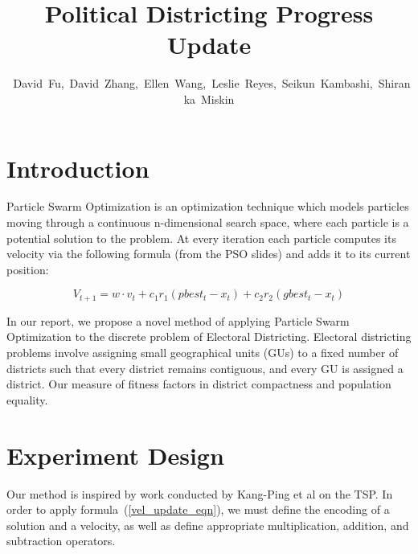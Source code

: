 \documentclass[journal]{IEEEtran}
\begin{document}
\title{Political Districting Progress Update}
\author{~David~Fu,~David~Zhang,~Ellen~Wang,~Leslie~Reyes,~Seikun~Kambashi,~Shiranka~Miskin}
\maketitle




\section{Introduction}

Particle Swarm Optimization is an optimization technique which models particles
moving through a continuous n-dimensional search space, where each particle is a
potential solution to the problem.  At every iteration each particle computes
its velocity via the following formula (from the PSO slides) and adds it to its
current position:

\begin{equation}
\label{vel_update_eqn}
V_{t+ 1} = w \cdot v_t + c_1 r_1 (pbest_t - x_t) + c_2 r_2 (gbest_t - x_t)
\end{equation}

In our report, we propose a novel method of applying Particle Swarm Optimization
to the discrete problem of Electoral Districting.  Electoral districting
problems involve assigning small geographical units (GUs) to a fixed number of
districts such that every district remains contiguous, and every GU is assigned
a district.  Our measure of fitness factors in district compactness and
population equality.

\section{Experiment Design}

Our method is inspired by work conducted by Kang-Ping et al\cite{tsp-pso} on the
TSP\@. In order to apply formula~(\ref{vel_update_eqn}), we must define the
encoding of a solution and a velocity, as well as define appropriate
multiplication, addition, and subtraction operators.
\end{document}
